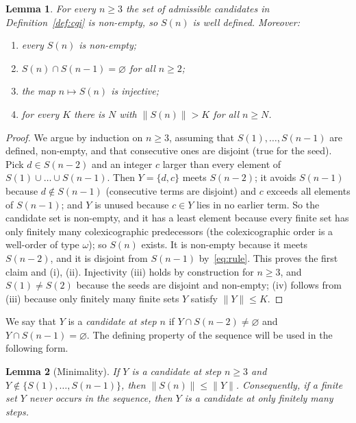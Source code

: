 \documentclass[11pt]{amsart}
\newtheorem{lemma}{Lemma}[section]
\theoremstyle{definition}
\theoremstyle{remark}
\begin{document}
\begin{lemma}\label{lem:basic}
For every $n\ge3$ the set of admissible candidates in Definition~\ref{def:cgi} is non-empty, so
$S(n)$ is well defined. Moreover:
\begin{enumerate}[label=\textup{(\roman*)},leftmargin=2em]
\item every $S(n)$ is non-empty;
\item $S(n)\cap S(n-1)=\varnothing$ for all $n\ge2$;
\item the map $n\mapsto S(n)$ is injective;
\item for every $K$ there is $N$ with $\|S(n)\|>K$ for all $n\ge N$.
\end{enumerate}
\end{lemma}

\begin{proof}
We argue by induction on $n\ge3$, assuming that $S(1),\dots,S(n-1)$ are defined, non-empty, and
that consecutive ones are disjoint (true for the seed). Pick $d\in S(n-2)$ and an integer $c$
larger than every element of $S(1)\cup\dots\cup S(n-1)$. Then $Y=\{d,c\}$ meets $S(n-2)$; it
avoids $S(n-1)$ because $d\notin S(n-1)$ (consecutive terms are disjoint) and $c$ exceeds all
elements of $S(n-1)$; and $Y$ is unused because $c\in Y$ lies in no earlier term. So the
candidate set is non-empty, and it has a least element because every finite set has only
finitely many colexicographic predecessors (the colexicographic order is a well-order of type
$\omega$); so $S(n)$ exists. It is non-empty because it meets $S(n-2)$, and it is disjoint from
$S(n-1)$ by~\eqref{eq:rule}. This proves the first claim and (i), (ii). Injectivity (iii) holds by
construction for $n\ge3$, and $S(1)\neq S(2)$ because the seeds are disjoint and non-empty;
(iv) follows from (iii) because only finitely many finite sets $Y$ satisfy $\|Y\|\le K$.
\end{proof}

We say that $Y$ is a \emph{candidate at step $n$} if $Y\cap S(n-2)\neq\varnothing$ and
$Y\cap S(n-1)=\varnothing$. The defining property of the sequence will be used in the following
form.

\begin{lemma}[Minimality]\label{lem:min}
If $Y$ is a candidate at step $n\ge3$ and $Y\notin\{S(1),\dots,S(n-1)\}$, then
$\|S(n)\|\le\|Y\|$. Consequently, if a finite set $Y$ never occurs in the sequence, then $Y$ is a
candidate at only finitely many steps.
\end{lemma}
\end{document}
